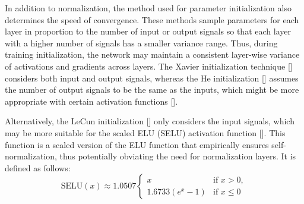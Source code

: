\documentclass[12pt,a4paper]{report}
\begin{document}
In addition to normalization, the method used for parameter initialization also determines the speed of convergence. These methods sample parameters for each layer in proportion to the number of input or output signals so that each layer with a higher number of signals has a smaller variance range. Thus, during training initialization, the network may maintain a consistent layer-wise variance of activations and gradients across layers. The Xavier initialization technique [\cite{glorot2010}] considers both input and output signals, whereas the He initialization [\cite{he2015}] assumes the number of output signals to be the same as the inputs, which might be more appropriate with certain activation functions [\cite{mlbook}].

Alternatively, the LeCun initialization [\cite{lecun2012}] only considers the input signals, which may be more suitable for the scaled ELU (SELU) activation function [\cite{klambauer2017, mlbook}]. This function is a scaled version of the ELU function that empirically ensures self-normalization, thus potentially obviating the need for normalization layers. It is defined as follows:
%
\begin{equation}
 \text{SELU}(x) \approx 1.0507 \begin{cases} 
x & \text{if } x > 0, \\
1.6733 ( e^x - 1) & \text{if } x \leq 0 
\end{cases}
\end{equation}
\end{document}
